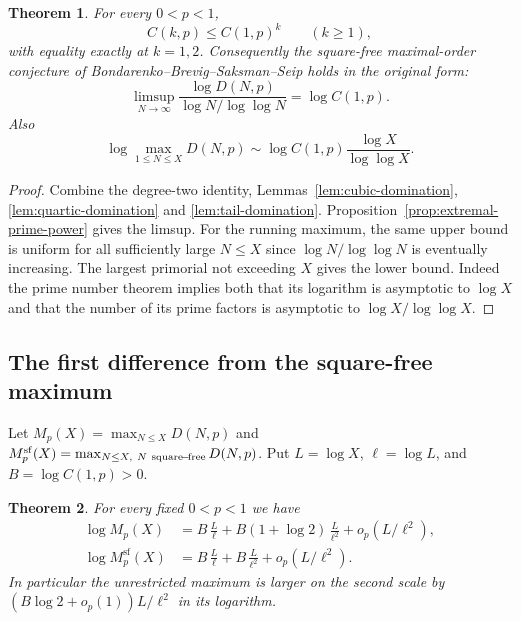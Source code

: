 \documentclass[11pt]{article}
\newtheorem{theorem}{Theorem}
\begin{document}
\begin{theorem}\label{thm:dirichlet-main}
For every \(0<p<1\),
\[
 C(k,p)\le C(1,p)^k\qquad(k\ge1),
\]
with equality exactly at \(k=1,2\).
Consequently the square-free maximal-order conjecture of
Bondarenko--Brevig--Saksman--Seip holds in the original form:
\[
 \limsup_{N\to\infty}\frac{\log D(N,p)}{\log N/\log\log N}
   =\log C(1,p).
\]
Also
\[
 \log\max_{1\le N\le X}D(N,p)
    \sim \log C(1,p)\frac{\log X}{\log\log X}.
\]
\end{theorem}

\begin{proof}
Combine the degree-two identity, Lemmas~\ref{lem:cubic-domination},
\ref{lem:quartic-domination} and \ref{lem:tail-domination}.
Proposition~\ref{prop:extremal-prime-power} gives the limsup.
For the running maximum, the same upper bound is uniform for
all sufficiently large \(N\le X\) since
\(\log N/\log\log N\) is eventually increasing. The largest
primorial not exceeding \(X\) gives the lower bound. Indeed
the prime number theorem implies both that its logarithm is
asymptotic to \(\log X\) and that the number of its prime
factors is asymptotic to \(\log X/\log\log X\).
\end{proof}

\subsection{The first difference from the square-free maximum}

Let \(M_p(X)=\max_{N\le X}D(N,p)\) and
\(M_p^{\mathrm{sf}}(X)=\max_{N\le X,\ N\ {\rm square\!-\!free}}
D(N,p)\). Put \(L=\log X\), \(\ell=\log L\), and
\(B=\log C(1,p)>0\).

\begin{theorem}\label{thm:second-order-dir}
For every fixed \(0<p<1\) we have
\begin{align*}
 \log M_p(X)
   &=B\,\frac{L}{\ell}
        +B(1+\log2)\,\frac{L}{\ell^2}
        +o_p(L/\ell^2),\\
 \log M_p^{\mathrm{sf}}(X)
   &=B\,\frac{L}{\ell}
        +B\,\frac{L}{\ell^2}
        +o_p(L/\ell^2).
\end{align*}
In particular the unrestricted maximum is larger on the
second scale by
\((B\log2+o_p(1))L/\ell^2\) in its logarithm.
\end{theorem}
\end{document}
